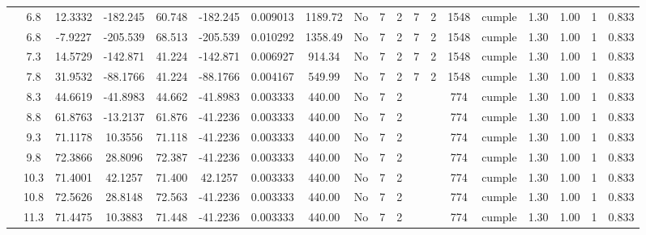 \begin{table}[H]
{\begin{tabular}{|c|c|c|c|c|c|r|c|c|c|c|c|c|c|c|c|c|c|c|}
\cline{2-19}        & \cellcolor[rgb]{ .851,  .882,  .949}6.8 & 12.3332 & -182.245 & 60.748 & -182.245 & 0.009013 & 1189.72 & No  & 7   & 2   & 7   & 2   & 1548 & \cellcolor[rgb]{ .776,  .937,  .808}cumple & 1.30 & 1.00 & 1   & 0.833 \bigstrut\\
\cline{2-19}        & \cellcolor[rgb]{ .851,  .882,  .949}6.8 & -7.9227 & -205.539 & 68.513 & -205.539 & 0.010292 & 1358.49 & No  & 7   & 2   & 7   & 2   & 1548 & \cellcolor[rgb]{ .776,  .937,  .808}cumple & 1.30 & 1.00 & 1   & 0.833 \bigstrut\\
\cline{2-19}        & 7.3 & 14.5729 & -142.871 & 41.224 & -142.871 & 0.006927 & 914.34 & No  & 7   & 2   & 7   & 2   & 1548 & \cellcolor[rgb]{ .776,  .937,  .808}cumple & 1.30 & 1.00 & 1   & 0.833 \bigstrut\\
\cline{2-19}        & 7.8 & 31.9532 & -88.1766 & 41.224 & -88.1766 & 0.004167 & 549.99 & No  & 7   & 2   & 7   & 2   & 1548 & \cellcolor[rgb]{ .776,  .937,  .808}cumple & 1.30 & 1.00 & 1   & 0.833 \bigstrut\\
\cline{2-19}        & 8.3 & 44.6619 & -41.8983 & 44.662 & -41.8983 & 0.003333 & 440.00 & No  & 7   & 2   &     &     & 774 & \cellcolor[rgb]{ .776,  .937,  .808}cumple & 1.30 & 1.00 & 1   & 0.833 \bigstrut\\
\cline{2-19}        & 8.8 & 61.8763 & -13.2137 & 61.876 & -41.2236 & 0.003333 & 440.00 & No  & 7   & 2   &     &     & 774 & \cellcolor[rgb]{ .776,  .937,  .808}cumple & 1.30 & 1.00 & 1   & 0.833 \bigstrut\\
\cline{2-19}        & 9.3 & 71.1178 & 10.3556 & 71.118 & -41.2236 & 0.003333 & 440.00 & No  & 7   & 2   &     &     & 774 & \cellcolor[rgb]{ .776,  .937,  .808}cumple & 1.30 & 1.00 & 1   & 0.833 \bigstrut\\
\cline{2-19}        & 9.8 & 72.3866 & 28.8096 & 72.387 & -41.2236 & 0.003333 & 440.00 & No  & 7   & 2   &     &     & 774 & \cellcolor[rgb]{ .776,  .937,  .808}cumple & 1.30 & 1.00 & 1   & 0.833 \bigstrut\\
\cline{2-19}        & 10.3 & 71.4001 & 42.1257 & 71.400 & 42.1257 & 0.003333 & 440.00 & No  & 7   & 2   &     &     & 774 & \cellcolor[rgb]{ .776,  .937,  .808}cumple & 1.30 & 1.00 & 1   & 0.833 \bigstrut\\
\cline{2-19}        & 10.8 & 72.5626 & 28.8148 & 72.563 & -41.2236 & 0.003333 & 440.00 & No  & 7   & 2   &     &     & 774 & \cellcolor[rgb]{ .776,  .937,  .808}cumple & 1.30 & 1.00 & 1   & 0.833 \bigstrut\\
\cline{2-19}        & 11.3 & 71.4475 & 10.3883 & 71.448 & -41.2236 & 0.003333 & 440.00 & No  & 7   & 2   &     &     & 774 & \cellcolor[rgb]{ .776,  .937,  .808}cumple & 1.30 & 1.00 & 1   & 0.833 \bigstrut\\

\end{tabular}}
\end{table}
